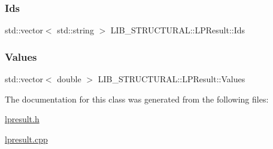 \subsubsection{\texorpdfstring{Ids}{Ids}}
{\footnotesize\ttfamily std\+::vector$<$ std\+::string $>$ L\+I\+B\+\_\+\+S\+T\+R\+U\+C\+T\+U\+R\+A\+L\+::\+L\+P\+Result\+::\+Ids}

\mbox{\label{class_l_i_b___s_t_r_u_c_t_u_r_a_l_1_1_l_p_result_a74ac4fa6befc2f1b07512030de7aaa59}} 
\subsubsection{\texorpdfstring{Values}{Values}}
{\footnotesize\ttfamily std\+::vector$<$ double $>$ L\+I\+B\+\_\+\+S\+T\+R\+U\+C\+T\+U\+R\+A\+L\+::\+L\+P\+Result\+::\+Values}



The documentation for this class was generated from the following files\+:\begin{DoxyCompactItemize}
\item 
\hyperlink{lpresult_8h}{lpresult.\+h}\item 
\hyperlink{lpresult_8cpp}{lpresult.\+cpp}\end{DoxyCompactItemize}
